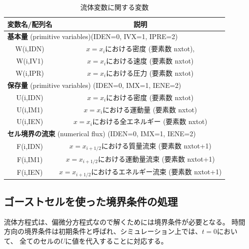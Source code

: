 {\begin{table}[h]
\begin{center}
\caption{流体変数に関する変数}
\begin{tabular}{|c|c|}
    \hline
    変数名/配列名 & 説明 \\
    \hline
    \hline
    \multicolumn{2}{|l|}{ {\bf 基本量} (primitive variables){\ttfamily (IDEN=0, IVX=1, IPRE=2)}} \\
    \hline
    {\ttfamily W(i,IDN)} & $x=x_i$における密度 (要素数 {\ttfamily nxtot}),   \\
    \hline
    {\ttfamily W(i,IV1)} & $x=x_i$における速度 (要素数 {\ttfamily nxtot}) \\
    \hline
    {\ttfamily W(i,IPR)} & $x=x_i$における圧力 (要素数 {\ttfamily nxtot}) \\
    \hline
    \multicolumn{2}{|l|}{ {\bf 保存量} (primitive variables) {\ttfamily (IDEN=0, IMX=1, IENE=2)}} \\
    \hline
    {\ttfamily U(i,IDN)} & $x=x_i$における密度 (要素数 {\ttfamily nxtot}) \\
    \hline
    {\ttfamily U(i,IM1)} & $x=x_i$における運動量 (要素数 {\ttfamily nxtot}) \\
    \hline
    {\ttfamily U(i,IEN)} & $x=x_i$における全エネルギー (要素数 {\ttfamily nxtot}) \\
    \hline
    \multicolumn{2}{|l|}{ {\bf セル境界の流束} (numerical flux) {\ttfamily (IDEN=0, IMX=1, IENE=2)}} \\
    \hline
    {\ttfamily F(i,IDN)} & $x=x_{i+1/2}$における質量流束 (要素数 {\ttfamily nxtot+1}) \\
    \hline
    {\ttfamily F(i,IM1)} & $x=x_{i+1/2}$における運動量流束 (要素数 {\ttfamily nxtot+1}) \\
    \hline
    {\ttfamily F(i,IEN)} & $x=x_{i+1/2}$におけるエネルギー流束 (要素数 {\ttfamily nxtot+1}) \\
    \hline
\end{tabular}
\end{center}
\label{tab:phys}
\end{table}



\subsection{ゴーストセルを使った境界条件の処理}

流体方程式は、偏微分方程式なので解くためには境界条件が必要となる。
時間方向の境界条件は初期条件と呼ばれ、シミュレーション上では、$t=0$において、
全てのセルの$U$に値を代入することに対応する。

}
